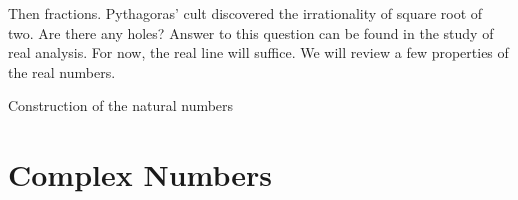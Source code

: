 Then fractions. Pythagoras' cult discovered the irrationality of square root of two. Are there any holes? Answer to this question can be found in the study of real analysis. For now, the real line will suffice.  We will review a few properties of the real numbers.

\begin{marginfigure}

\caption{Construction of the natural numbers}
\end{marginfigure}



\section{Complex Numbers}

